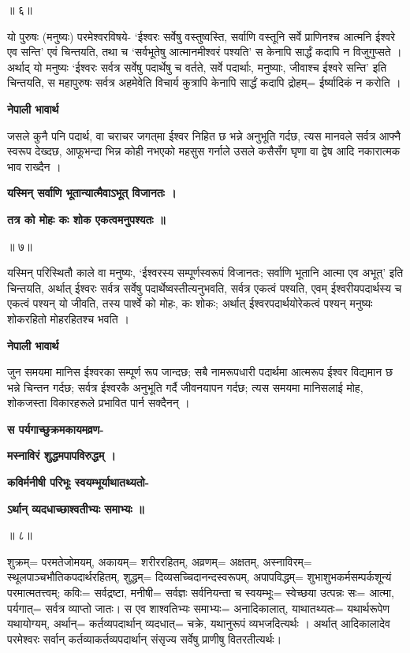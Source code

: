 \documentclass[11pt, a5paper]{article}
\begin{document}
॥ ६॥

यो पुरुषः (मनुष्यः) परमेश्वरविषये- ‘ईश्वरः सर्वेषु वस्तुष्वस्ति, सर्वाणि वस्तूनि सर्वे प्राणिनश्च आत्मनि ईश्वरे एव सन्ति’ एवं चिन्तयति, तथा च ‘सर्वभूतेषु आत्मानमीश्वरं पश्यति’ स केनापि सार्द्धं कदापि न विजुगुप्सते । अर्थाद् यो मनुष्यः ‘ईश्वरः सर्वत्र सर्वेषु पदार्थेषु च वर्तते, सर्वे पदार्थाः, मनुष्याः, जीवाश्च ईश्वरे सन्ति’ इति चिन्तयति, स महापुरुषः सर्वत्र अहमेवेति विचार्य कुत्रापि केनापि सार्द्धं कदापि द्रोहम्= ईर्ष्यादिकं न करोति ।

\textbf{नेपाली भावार्थ}

जसले कुनै पनि पदार्थ, वा चराचर जगत्‌मा ईश्वर निहित छ भन्ने अनुभूति गर्दछ, त्यस मानवले सर्वत्र आफ्नै स्वरूप देख्दछ, आफूभन्दा भिन्न कोही नभएको महसुस गर्नाले उसले कसैसँग घृणा वा द्वेष आदि नकारात्मक भाव राख्दैन ।

\textbf{यस्मिन् सर्वाणि भूतान्यात्मैवाऽभूत् विजानतः ।}

\textbf{तत्र को मोहः कः शोक एकत्वमनुपश्यतः ॥}

॥ ७॥

यस्मिन् परिस्थितौ काले वा मनुष्यः, ‘ईश्वरस्य सम्पूर्णस्वरूपं विजानतः; सर्वाणि भूतानि आत्मा एव अभूत्’ इति चिन्तयति,  अर्थात् ईश्वरः सर्वत्र सर्वेषु पदार्थेष्वस्तीत्यनुभवति, सर्वत्र एकत्वं पश्यति, एवम् ईश्वरीयपदार्थस्य च एकत्वं पश्यन् यो जीवति, तस्य पार्श्वे को मोहः, कः शोकः; अर्थात् ईश्वरपदार्थयोरेकत्वं पश्यन् मनुष्यः शोकरहितो मोहरहितश्च भवति ।

\textbf{नेपाली भावार्थ}

जुन समयमा मानिस ईश्वरका सम्पूर्ण रूप जान्दछ; सबै नामरूपधारी पदार्थमा आत्मरूप ईश्वर विद्यमान छ भन्ने चिन्तन गर्दछ;  सर्वत्र ईश्वरकै अनुभूति गर्दै जीवनयापन गर्दछ; त्यस समयमा मानिसलाई मोह, शोकजस्ता विकारहरूले प्रभावित पार्न सक्दैनन् ।

\textbf{स पर्यगाच्छुक्रमकायमव्रण-}

\textbf{मस्नाविरं शुद्धमपापविरुद्धम् ।}

\textbf{कविर्मनीषी परिभूः स्वयम्भूर्याथातथ्यतो-}

\textbf{ऽर्थान् व्यदधाच्छाश्वतीभ्यः समाभ्यः ॥}

॥ ८॥

शुक्रम्= परमतेजोमयम्, अकायम्= शरीररहितम्, अव्रणम्= अक्षतम्, अस्नाविरम्= स्थूलपाञ्चभौतिकपदार्थरहितम्, शुद्धम्= दिव्यसच्चिदानन्दस्वरूपम्, अपापविद्धम्= शुभाशुभकर्मसम्पर्कशून्यं परमात्मतत्त्वम्;  कविः= सर्वद्रष्टा, मनीषी= सर्वज्ञः सर्वनियन्ता च स्वयम्भूः= स्वेच्छया उत्पन्नः सः= आत्मा, पर्यगात्= सर्वत्र व्याप्तो जातः। स एव शाश्वतिभ्यः समाभ्यः= अनादिकालात्, याथातथ्यतः= यथार्थरूपेण यथायोग्यम्, अर्थान्= कर्तव्यपदार्थान् व्यदधात्= चक्रे, यथानुरूपं व्यभजदित्यर्थः । अर्थात् आदिकालादेव परमेश्वरः सर्वान् कर्तव्याकर्तव्यपदार्थान् संसृज्य सर्वेषु प्राणीषु वितरतीत्यर्थः।
\end{document}
